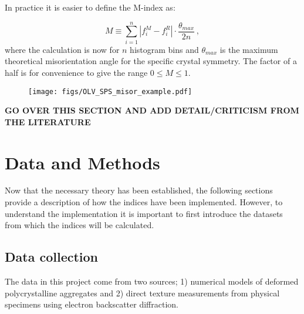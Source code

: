 \documentclass[a4paper,12pt]{report}
\numberwithin{equation}{chapter}
\begin{document}
In practice it is easier to define the M-index as:

\begin{equation} \label{eq:Mindex_disc}
M \equiv \sum_{i=1}^n | f_i^M - f_i^R | \cdot \frac{\theta_{max}}{2n}\ ,
\end{equation} 
where the calculation is now for $n$ histogram bins and $\theta_{max}$ is the maximum theoretical misorientation angle for the specific crystal symmetry. The factor of a half is for convenience to give the range $0 \leq M \leq 1$. 

\begin{figure}[th]
  \centering
    \texttt{[image: figs/OLV\_SPS\_misor\_example.pdf]}
  \caption[Misorientation angle distribution example (olivine VPSC)]{}
  \label{fig:misorientation_example}
\end{figure}


\textbf{GO OVER THIS SECTION AND ADD DETAIL/CRITICISM FROM THE LITERATURE}

\chapter{Data and Methods} \label{chap:methods}
\vspace{-1cm}

Now that the necessary theory has been established, the following sections provide a description of how the indices have been implemented. However, to understand the implementation it is important to first introduce the datasets from which the indices will be calculated.  

\section{Data collection} \label{sec:data}
The data in this project come from two sources; 1) numerical models of deformed polycrystalline aggregates and 2) direct texture measurements from physical specimens using electron backscatter diffraction. 
\end{document}
